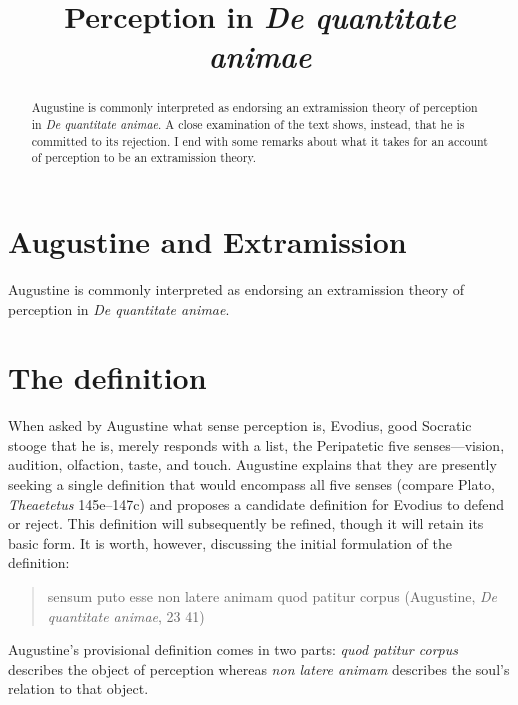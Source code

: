 \documentclass[12pt]{article}
\title{Perception in \emph{De quantitate animae}}
\author{\myauthor}
\date{} %
\begin{document}
\maketitle
\begin{abstract}
	\noindent Augustine is commonly interpreted as endorsing an extramission theory of perception in \emph{De quantitate animae}. A close examination of the text shows, instead, that he is committed to its rejection. I end with some remarks about what it takes for an account of perception to be an extramission theory.
\end{abstract}

\setlength{\parindent}{1em}


\section{Augustine and Extramission} %
\label{sec:augustine_and_extramission}

Augustine is commonly interpreted as endorsing an extramission theory of perception in \emph{De quantitate animae}. 


\section{The definition} %
\label{sec:the_definition}

When asked by Augustine what sense perception is, Evodius, good Socratic stooge that he is, merely responds with a list, the Peripatetic five senses---vision, audition, olfaction, taste, and touch. Augustine explains that they are presently seeking a single definition that would encompass all five senses (compare Plato, \emph{Theaetetus} 145e--147c) and proposes a candidate definition for Evodius to defend or reject. This definition will subsequently be refined, though it will retain its basic form. It is worth, however, discussing the initial formulation of the definition: 
\begin{quote}
	sensum puto esse non latere animam quod patitur corpus (Augustine, \emph{De quantitate animae}, 23 41)
\end{quote}
Augustine's provisional definition comes in two parts: \emph{quod patitur corpus} describes the object of perception whereas \emph{non latere animam} describes the soul's relation to that object. 
\end{document}
